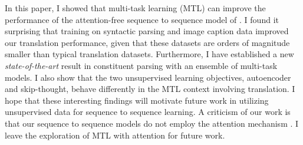 
In this paper, I showed that multi-task learning (MTL) can improve the
performance of the attention-free sequence to sequence model of
\citep{sutskever14}.  I found it surprising that training on syntactic
parsing and image caption data improved our translation performance, given
that these 
datasets are orders of magnitude smaller than typical translation
datasets. 
Furthermore, I have established a new {\it state-of-the-art} result in
constituent parsing with an ensemble of multi-task models.
I also show that the two unsupervised
learning objectives, autoencoder and skip-thought, behave differently in the MTL context
involving translation. I hope that these interesting
findings will motivate future work in utilizing unsupervised data for sequence
to sequence learning.
A criticism of our work is that our sequence to sequence models do not employ
the attention mechanism \citep{bog15}.  I leave the exploration
of MTL with attention for future work.



